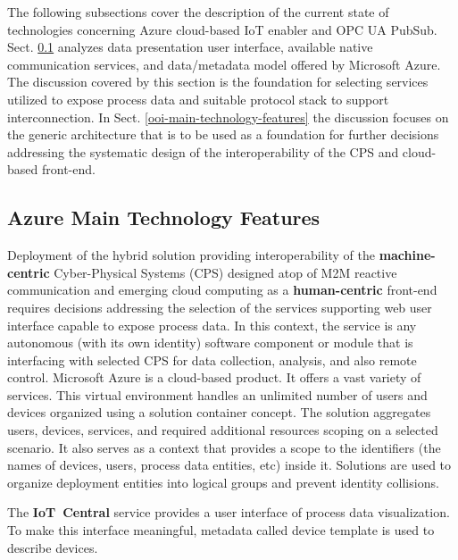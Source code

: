 \documentclass[runningheads]{llncs}
\begin{document}
The following subsections cover the description of the current state of technologies concerning Azure cloud-based IoT enabler and OPC UA PubSub. Sect. \ref{azure-main-technology-features} analyzes data presentation user interface, available native communication services, and data/metadata model offered by Microsoft Azure. The discussion covered by this section is the foundation for selecting services utilized to expose process data and suitable protocol stack to support interconnection. In Sect. \ref{ooi-main-technology-features} the discussion focuses on the generic architecture that is to be used as a foundation for further decisions addressing the systematic design of the interoperability of the CPS and cloud-based front-end.

\subsection{Azure Main Technology Features}\label{azure-main-technology-features}

Deployment of the hybrid solution providing interoperability of the \textbf{machine-centric} Cyber-Physical Systems (CPS) designed atop of M2M reactive communication and emerging cloud computing as a \textbf{human-centric} front-end requires decisions addressing the selection of the services supporting web user interface capable to expose process data. In this context, the service is any autonomous (with its own identity) software component or module that is interfacing with selected CPS for data collection, analysis, and also remote control. Microsoft Azure is a cloud-based product. It offers a vast variety of services. This virtual environment handles an unlimited number of users and devices organized using a solution container concept. The solution aggregates users, devices, services, and required additional resources scoping on a selected scenario. It also serves as a context that provides a scope to the identifiers (the names of devices, users, process data entities, etc) inside it. Solutions are used to organize deployment entities into logical groups and prevent identity collisions.

The \textbf{IoT\ Central} service provides a user interface of process data visualization. To make this interface meaningful, metadata called device template is used to describe devices.
\end{document}
